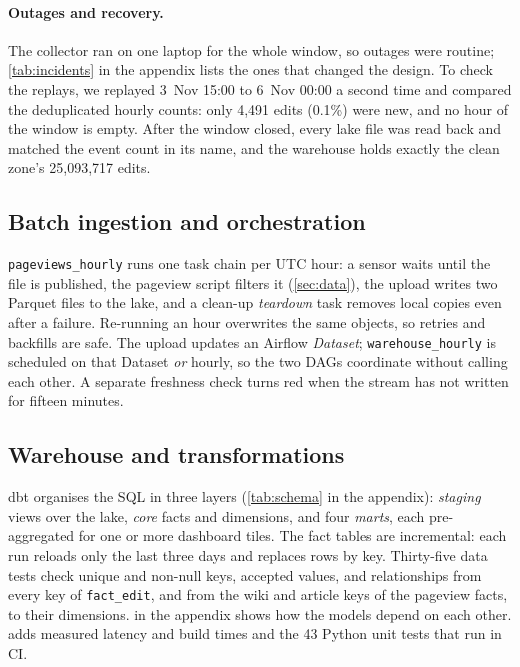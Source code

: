 \paragraph{Outages and recovery.} The collector ran on one laptop for the whole window, so outages were
routine; \cref{tab:incidents} in the appendix lists the ones that changed the design. To check the replays, we replayed
3~Nov 15:00 to 6~Nov 00:00 a second time and compared the deduplicated hourly counts: only 4,491 edits
(0.1\%) were new, and no hour of the window is empty. After the window closed, every lake file was read back and matched
the event count in its name, and the warehouse holds exactly the clean zone's 25,093,717 edits.

\subsection{Batch ingestion and orchestration}\label{sec:impl-batch}

\texttt{pageviews\_hourly} runs one task chain per UTC hour: a sensor waits until the file is
published, the pageview script filters it (\cref{sec:data}), the upload writes two Parquet files to
the lake, and a clean-up \emph{teardown} task removes local copies even after a failure. Re-running an hour overwrites
the same objects, so retries and backfills are safe. The upload updates an Airflow \emph{Dataset};
\texttt{warehouse\_hourly} is scheduled on that Dataset \emph{or} hourly, so the two DAGs coordinate
without calling each other. A separate freshness check turns red when the stream has not written for
fifteen minutes.

\subsection{Warehouse and transformations}\label{sec:impl-dbt}

dbt organises the SQL in three layers (\cref{tab:schema} in the appendix): \emph{staging} views over the lake,
\emph{core} facts and dimensions, and four \emph{marts}, each pre-aggregated for one or more dashboard tiles. The fact tables are
incremental: each run reloads only the last three days and replaces rows by key. Thirty-five data tests check
unique and non-null keys, accepted values, and relationships from every key of \texttt{fact\_edit}, and
from the wiki and article keys of the pageview facts, to their dimensions.
 in the appendix shows how the models depend on each other. 
adds measured latency and build times and the 43 Python unit tests that run in CI.

